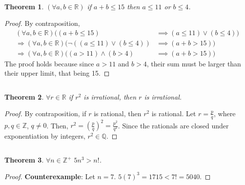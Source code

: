 \documentclass{article}
\newtheorem{theorem}{Theorem}
\newcommand{\Z}{\mathbb{Z}}
\newcommand{\Q}{\mathbb{Q}}
\newcommand{\R}{\mathbb{R}}
\begin{document}
\subsection{}

\begin{theorem}
    \((\forall a, b \in \R)\) if \(a + b \leqslant 15\) then \(a \leqslant 11\) or \(b \leqslant 4\).
\end{theorem}
\begin{proof}
    By contraposition,
    \begin{align}
        (\forall a, b \in \R)((a + b \leqslant 15) &\implies (a \leqslant 11) \lor (b \leqslant 4)) \\
        \Rightarrow (\forall a, b \in \R)(\lnot ((a \leqslant 11) \lor (b \leqslant 4)) &\implies (a + b > 15)) \\
        \Rightarrow (\forall a, b \in \R)((a > 11) \land (b > 4) &\implies (a + b > 15))
    \end{align}
    The proof holds because since \(a > 11\) and \(b > 4\), their sum must be larger than their upper limit, that being 15.
\end{proof}

\subsection{}

\begin{theorem}
    \(\forall r \in \R\) if \(r^2\) is irrational, then \(r\) is irrational.
\end{theorem}
\begin{proof}
    By contraposition, if \(r\) is rational, then \(r^2\) is rational.
    Let \(r = \frac{p}{q}\), where \(p, q \in \Z\), \(q \neq 0\).
    Then, \(r^2 = \left(\frac{p}{q}\right)^2 = \frac{p^2}{q^2}\).
    Since the rationals are closed under exponentiation by integers, \(r^2 \in \Q\).
\end{proof}

\subsection{}

\begin{theorem}
    \(\forall n \in \Z^+\) \(5n^3 > n!\).
\end{theorem}
\begin{proof}
    \textbf{Counterexample}: Let \(n = 7\).
    \(5 (7)^3 = 1715 < 7! = 5040.\)
\end{proof}
\end{document}
